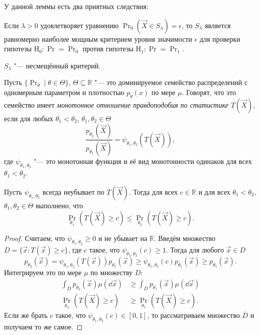 У данной леммы есть два приятных следствия:
\begin{consequence}
	Если $\lambda > 0$ удовлетворяет уравнению $\Pr_{0}(\vec{X} \in S_{\lambda}) = \epsilon$, то $S_{\lambda}$ является равномерно наиболее мощным критерием уровня значимости $\epsilon$ для проверки гипотезы $\mathrm{H}_{0} \colon \Pr = \Pr_{0}$ против гипотезы $\mathrm{H}_{1} \colon \Pr = \Pr_{1}$.
\end{consequence}
\begin{consequence}
	$S_{\lambda}$ "--- несмещённый критерий.
\end{consequence}

\begin{definition}
	Пусть $\{\Pr_{\theta} \mid \theta \in \Theta\}$, $\Theta \subseteq \mathbb{R}$ "--- это доминируемое семейство распределений с одномерным параметром и плотностью $p_{\theta}(x)$ по мере $\mu$. Говорят, что это семейство имеет \emph{монотонное отношение правдоподобия по статистике $T(\vec{X})$}, если для любых $\theta_{1} < \theta_{2}$, $\theta_{1}, \theta_{2} \in \Theta$
	\begin{equation}
		\frac{p_{\theta_{2}}(\vec{X})}{p_{\theta_{1}}(\vec{X})} = \psi_{\theta_{1}, \theta_{2}}(T(\vec{X})),
	\end{equation}
	где $\psi_{\theta_{1}, \theta_{2}}$ "--- это монотонная функция и её вид монотонности одинаков для всех $\theta_{1} < \theta_{2}$.
\end{definition}
\begin{lemma}
	Пусть $\psi_{\theta_{1}, \theta_{2}}$ всегда неубывает по $T(\vec{X})$. Тогда для всех $c \in \mathbb{R}$ и для всех $\theta_{1} < \theta_{2}$, $\theta_{1}, \theta_{2} \in \Theta$ выполнено, что
	\begin{equation}
		\Pr_{\theta_{1}}(T(\vec{X}) \geq c) \leq \Pr_{\theta_{2}}(T(\vec{X}) \geq c).
	\end{equation}
\end{lemma}
\begin{proof}
	Считаем, что $\psi_{\theta_{1}, \theta_{2}} \geq 0$ и не убывает на $\mathbb{R}$. Введём множество $D = \{\vec{x} \colon T(\vec{x}) \geq c\}$, где $c$ такое, что $\psi_{\theta_{1}, \theta_{2}}(c) \geq 1$. Тогда для любого $\vec{x} \in D$
	\begin{equation}
		p_{\theta_{2}}(\vec{x}) = \psi_{\theta_{1}, \theta_{2}}(T(\vec{x}))p_{\theta_{1}}(\vec{x}) \geq \psi_{\theta_{1}, \theta_{2}}(c)p_{\theta_{1}}(\vec{x}) \geq p_{\theta_{1}}(\vec{x}).
	\end{equation}
	Интегрируем это по мере $\mu$ по множеству $D$:
	\begin{align}
		\int_{D} p_{\theta_{2}}(\vec{x})\mu(\dd \vec{x}) &\geq \int_{D} p_{\theta_{1}}(\vec{x})\mu(\dd \vec{x}) \\
		\Pr_{\theta_{2}}(T(\vec{X}) \geq c) &\geq \Pr_{\theta_{1}}(T(\vec{X}) \geq c).
	\end{align}
	Если же брать $c$ такое, что $\psi_{\theta_{1}, \theta_{2}}(c) \in [0, 1]$, то рассматриваем множество $\overline{D}$ и получаем то же самое.
\end{proof}

